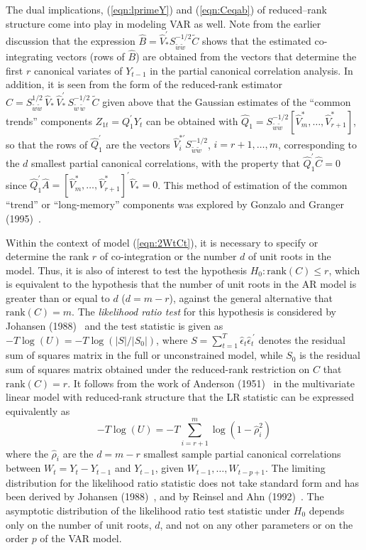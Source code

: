 The dual implications, (\ref{eqn:lprimeY}) and (\ref{eqn:Ceqab}) of reduced--rank structure come into play in modeling VAR as well. Note from the earlier discussion that the expression $\hat{B} = \hat{V}_*^{\prime} S_{\tilde{w} \tilde{w}}^{-1/2} \tilde{C}$ shows that the estimated co-integrating vectors (rows of $\hat{B}$) are obtained from the vectors that determine the first $r$ canonical variates of $Y_{t-1}$ in the partial canonical correlation analysis. In addition, it is seen from the form of the reduced-rank estimator $\hat{C} = S_{\tilde{w} \tilde{w}}^{1/2} \,\hat{V}_* \,\hat{V}_*^{\prime} \,S_{\tilde{w} \,\tilde{w}}^{-1/2} \,\tilde{C}$ given above that the Gaussian estimates of the ``common trends'' components $Z_{1t} = Q_1^{\prime} Y_t$ can be obtained with $\hat{Q}_1 = S_{\tilde{w} \tilde{w}}^{-1/2} [\hat{V}_m^* ,\ldots, \hat{V}_{r+1}^* ]$, so that the rows of $\hat{Q}_1^{\prime}$ are the vectors $\hat{V}_i^{* \prime} S_{\tilde{w} \tilde{w}}^{-1/2}$, $i = r\!+\!1 ,\ldots,m$, corresponding to the $d$ smallest partial canonical correlations, with the property that $\hat{Q}_1^{\prime} \hat{C} = 0$ since $\hat{Q}_1^{\prime} \hat{A} = [\hat{V}_m^* ,\ldots, \hat{V}_{r+1}^* ]^{\prime} \hat{V}_* = 0$. This method of estimation of the common ``trend'' or ``long-memory'' components was explored by Gonzalo and Granger (1995)~\cite{gongra}.


Within the context of model (\ref{eqn:2WtCt}), it is necessary to specify or determine the rank $r$ of co-integration or the number $d$ of unit roots in the model. Thus, it is also of interest to test the hypothesis $H_0\!:\!\mbox{rank} (C) \leq r$, which is equivalent to the hypothesis that the number of unit roots in the AR model is greater than or equal to $d$ ($d = m\!-\!r$), against the general alternative that $\mbox{rank} (C) = m$.  The {\it likelihood ratio test} for this hypothesis is considered by Johansen (1988)~\cite{johansen1988statistical} and the test statistic is given as $- T \log (U) = - T \log ( \left|S \right| / \left| S_0 \right| )$, where $S = \sum_{t=1}^T \hat{\epsilon}_t \hat{\epsilon}_t^{\: \prime} $ denotes the residual sum of squares matrix in the full or unconstrained model, while $S_0 $ is the residual sum of squares matrix obtained under the reduced-rank restriction on $C$ that $\mbox{rank} (C) = r $.  It follows from the work of Anderson (1951)~\cite{andersontw} in the multivariate linear model with reduced-rank structure that the LR statistic can be expressed equivalently as
	\begin{equation}\label{eqn:2negT}
	- T \log (U) = - T \sum_{i=r+1}^m \log ( 1 - \hat{\rho}_i^2 )
	\end{equation}
where the $\hat{\rho}_i$ are the $d = m\!-\!r$ smallest sample partial canonical correlations between $W_t = Y_t - Y_{t-1} $ and $Y_{t-1}$, given $W_{t-1} ,\ldots, W_{t-p+1}$. The limiting distribution for the likelihood ratio statistic does not take standard form and has been derived by Johansen (1988)~\cite{johansen1988statistical}, and by Reinsel and Ahn (1992)~\cite{reinsel1992vector}. The asymptotic distribution of the likelihood ratio test statistic under $H_0$ depends only on the number of unit roots, $d$, and not on any other parameters or on the order $p$ of the VAR model.


